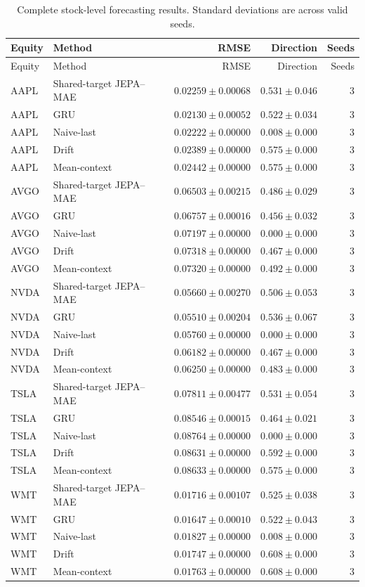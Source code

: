 \begin{longtable}{llrrr}
\caption{Complete stock-level forecasting results. Standard deviations are across valid seeds.}\label{tab:appendix_stock_metrics}\\
\toprule
Equity & Method & RMSE & Direction & Seeds \\
\midrule
\endfirsthead
\toprule
Equity & Method & RMSE & Direction & Seeds \\
\midrule
\endhead
AAPL & Shared-target JEPA--MAE & $0.02259 \pm 0.00068$ & $0.531 \pm 0.046$ & 3 \\
AAPL & GRU & $0.02130 \pm 0.00052$ & $0.522 \pm 0.034$ & 3 \\
AAPL & Naive-last & $0.02222 \pm 0.00000$ & $0.008 \pm 0.000$ & 3 \\
AAPL & Drift & $0.02389 \pm 0.00000$ & $0.575 \pm 0.000$ & 3 \\
AAPL & Mean-context & $0.02442 \pm 0.00000$ & $0.575 \pm 0.000$ & 3 \\
AVGO & Shared-target JEPA--MAE & $0.06503 \pm 0.00215$ & $0.486 \pm 0.029$ & 3 \\
AVGO & GRU & $0.06757 \pm 0.00016$ & $0.456 \pm 0.032$ & 3 \\
AVGO & Naive-last & $0.07197 \pm 0.00000$ & $0.000 \pm 0.000$ & 3 \\
AVGO & Drift & $0.07318 \pm 0.00000$ & $0.467 \pm 0.000$ & 3 \\
AVGO & Mean-context & $0.07320 \pm 0.00000$ & $0.492 \pm 0.000$ & 3 \\
NVDA & Shared-target JEPA--MAE & $0.05660 \pm 0.00270$ & $0.506 \pm 0.053$ & 3 \\
NVDA & GRU & $0.05510 \pm 0.00204$ & $0.536 \pm 0.067$ & 3 \\
NVDA & Naive-last & $0.05760 \pm 0.00000$ & $0.000 \pm 0.000$ & 3 \\
NVDA & Drift & $0.06182 \pm 0.00000$ & $0.467 \pm 0.000$ & 3 \\
NVDA & Mean-context & $0.06250 \pm 0.00000$ & $0.483 \pm 0.000$ & 3 \\
TSLA & Shared-target JEPA--MAE & $0.07811 \pm 0.00477$ & $0.531 \pm 0.054$ & 3 \\
TSLA & GRU & $0.08546 \pm 0.00015$ & $0.464 \pm 0.021$ & 3 \\
TSLA & Naive-last & $0.08764 \pm 0.00000$ & $0.000 \pm 0.000$ & 3 \\
TSLA & Drift & $0.08631 \pm 0.00000$ & $0.592 \pm 0.000$ & 3 \\
TSLA & Mean-context & $0.08633 \pm 0.00000$ & $0.575 \pm 0.000$ & 3 \\
WMT & Shared-target JEPA--MAE & $0.01716 \pm 0.00107$ & $0.525 \pm 0.038$ & 3 \\
WMT & GRU & $0.01647 \pm 0.00010$ & $0.522 \pm 0.043$ & 3 \\
WMT & Naive-last & $0.01827 \pm 0.00000$ & $0.008 \pm 0.000$ & 3 \\
WMT & Drift & $0.01747 \pm 0.00000$ & $0.608 \pm 0.000$ & 3 \\
WMT & Mean-context & $0.01763 \pm 0.00000$ & $0.608 \pm 0.000$ & 3 \\
\bottomrule
\end{longtable}
